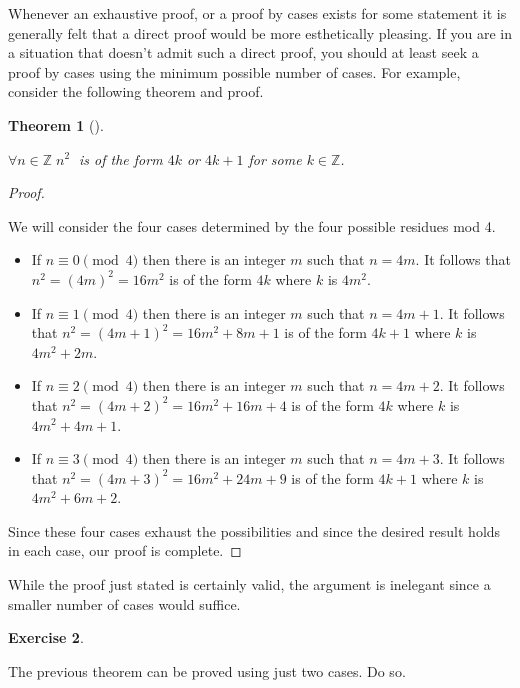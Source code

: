 \documentclass[10pt,]{book}
\theoremstyle{plain}
\newtheorem{theorem}{Theorem}[section]
\theoremstyle{definition}
\theoremstyle{definition}
\newtheorem{exercise}[theorem]{Exercise}
\numberwithin{equation}{section}
\newcommand{\Integers}{{\mathbb Z}}
\begin{document}
    Whenever an exhaustive proof, or a proof by cases exists for some statement
    it is generally felt that a direct proof would be more esthetically pleasing.
    If you are in a situation that doesn't admit such a direct proof, you should
    at least seek a proof by cases using the minimum possible number of cases.
    For example, consider the following theorem and proof.
\begin{theorem}[{}]\label{theorem-10}

        \(\forall n \in \Integers \; n^2 \;\) is of the form \(4k\) or
        \(4k+1\) for some \(k \in \Integers\).
\end{theorem}
\begin{proof}\hypertarget{proof-17}{}

    We will consider the four cases determined by the four
    possible residues mod 4.

    \leavevmode%
\begin{itemize}[label=\textbullet]
\item{}
          If \(n \equiv 0 \pmod{4}\) then there is an integer \(m\)
          such that \(n = 4m\).  It follows that \(n^2 = (4m)^2 = 16m^2\) is of the 
          form \(4k\) where \(k\) is \(4m^2\).
\item{}
          If \(n \equiv 1 \pmod{4}\) then there is an integer \(m\)
          such that \(n = 4m+1\).  It follows that \(n^2 = (4m+1)^2 = 16m^2 + 8m + 1\) 
          is of the form \(4k+1\) where \(k\) is \(4m^2+2m\).
\item{}
          If \(n \equiv 2 \pmod{4}\) then there is an integer \(m\)
          such that \(n = 4m+2\).  It follows that \(n^2 = (4m+2)^2 = 16m^2 + 16m + 4\) 
          is of the form \(4k\) where \(k\) is \(4m^2+4m+1\).
\item{}
          If \(n \equiv 3 \pmod{4}\) then there is an integer \(m\)
          such that \(n = 4m+3\).  It follows that \(n^2 = (4m+3)^2 = 16m^2 + 24m + 9\) 
          is of the form \(4k+1\) where \(k\) is \(4m^2+6m+2\).
\end{itemize}

\par

      Since these four cases exhaust the possibilities and since the desired
      result holds in each case, our proof is complete.
\end{proof}
\par

    While the proof just stated is certainly valid, the argument is inelegant
    since a smaller number of cases would suffice.
\begin{exercise}\label{exercise-24}

        The previous theorem can be proved using just two cases. Do so.
\end{exercise}
\par
\end{document}
